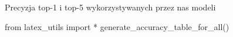 \documentclass[
    left=2.5cm,         %
    right=2.5cm,        %
    top=2.5cm,          %
    bottom=3cm,         %
    bindingoffset=6mm,  %
    nohyphenation=false %
]{eiti/eiti-thesis}
\begin{document}

\begin{table}[ht]
\centering
\caption{Precyzja top-1 i top-5 wykorzystywanych przez nas modeli}
\begin{adjustbox}{max width=\textwidth}
\begin{pycode}
from latex_utils import *
generate_accuracy_table_for_all()
\end{pycode}
\end{adjustbox}
\end{table}


\newpage
\end{document}
